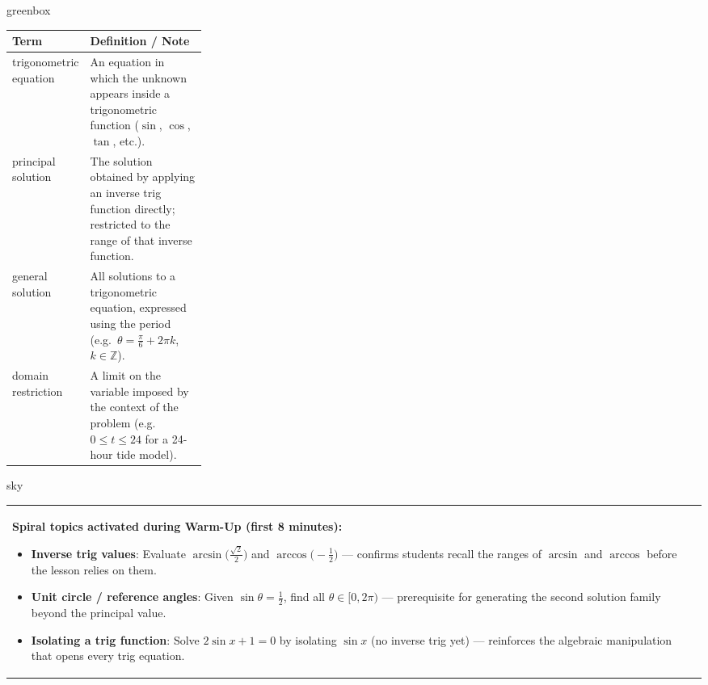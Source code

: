 \documentclass[10pt]{article}
\begin{document}
\begin{skillbox}{greenbox}
\begin{tabularx}{\linewidth}{@{} p{0.28\linewidth} X @{}}
\textbf{Term} & \textbf{Definition / Note} \\
\midrule
trigonometric equation &
  An equation in which the unknown appears inside a trigonometric
  function ($\sin$, $\cos$, $\tan$, etc.). \\[4pt]
principal solution &
  The solution obtained by applying an inverse trig function directly;
  restricted to the range of that inverse function. \\[4pt]
general solution &
  All solutions to a trigonometric equation, expressed using the period
  (e.g.\ $\theta = \tfrac{\pi}{6} + 2\pi k$, $k \in \mathbb{Z}$). \\[4pt]
domain restriction &
  A limit on the variable imposed by the context of the problem
  (e.g.\ $0 \le t \le 24$ for a 24-hour tide model). \\
\end{tabularx}
\end{skillbox}

\vspace{0.08in}

\begin{skillbox}{sky}
\begin{tabularx}{\linewidth}{@{}X@{}}
\textbf{Spiral topics activated during Warm-Up (first 8 minutes):}
\begin{itemize}[leftmargin=1.4em, itemsep=2pt]
  \item \textbf{Inverse trig values}: Evaluate $\arcsin\!\bigl(\tfrac{\sqrt{2}}{2}\bigr)$
    and $\arccos\!\bigl(-\tfrac{1}{2}\bigr)$ --- confirms students recall the
    ranges of $\arcsin$ and $\arccos$ before the lesson relies on them.
  \item \textbf{Unit circle / reference angles}: Given $\sin\theta = \tfrac{1}{2}$,
    find all $\theta \in [0, 2\pi)$ --- prerequisite for generating the second
    solution family beyond the principal value.
  \item \textbf{Isolating a trig function}: Solve $2\sin x + 1 = 0$ by isolating
    $\sin x$ (no inverse trig yet) --- reinforces the algebraic manipulation that
    opens every trig equation.
\end{itemize}
\end{tabularx}
\end{skillbox}
\end{document}
